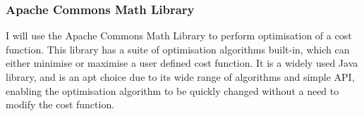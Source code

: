\subsubsection{Apache Commons Math Library}

I will use the Apache Commons Math Library\cite{apachemath} to perform optimisation of a cost function. This library has a suite of optimisation algorithms built-in, which can either minimise or maximise a user defined cost function. It is a widely used Java library, and is an apt choice due to its wide range of algorithms and simple API, enabling the optimisation algorithm to be quickly changed without a need to modify the cost function.